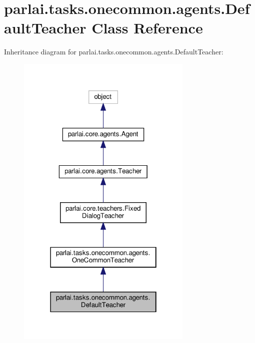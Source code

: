\hypertarget{classparlai_1_1tasks_1_1onecommon_1_1agents_1_1DefaultTeacher}{}\section{parlai.\+tasks.\+onecommon.\+agents.\+Default\+Teacher Class Reference}
\label{classparlai_1_1tasks_1_1onecommon_1_1agents_1_1DefaultTeacher}


Inheritance diagram for parlai.\+tasks.\+onecommon.\+agents.\+Default\+Teacher\+:
\nopagebreak
\begin{figure}[H]
\begin{center}
\leavevmode
\includegraphics[width=238pt]{d1/dae/classparlai_1_1tasks_1_1onecommon_1_1agents_1_1DefaultTeacher__inherit__graph}
\end{center}
\end{figure}


